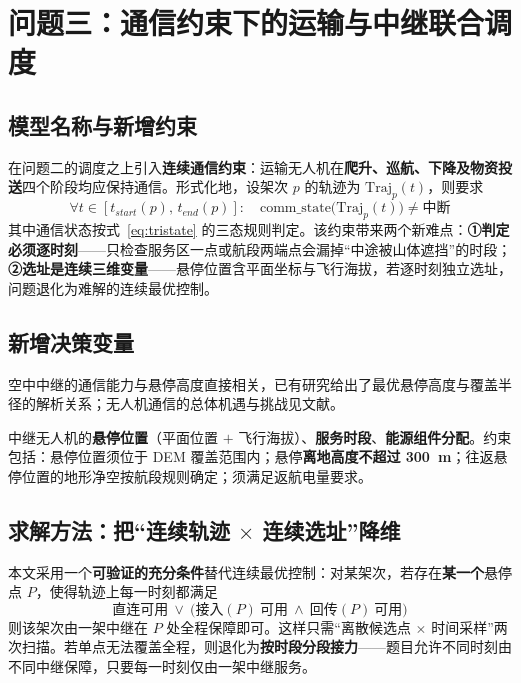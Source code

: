 \section{问题三：通信约束下的运输与中继联合调度}\label{sec:q3}

\subsection{模型名称与新增约束}

在问题二的调度之上引入\textbf{连续通信约束}：运输无人机在\textbf{爬升、巡航、下降及物资投送}四个阶段均应保持通信。形式化地，设架次 $p$ 的轨迹为 $\mathrm{Traj}_{p}(t)$，则要求
\begin{equation}
	\forall t\in[t_{start}(p),\,t_{end}(p)]:\quad
	\mathrm{comm\_state}\big(\mathrm{Traj}_{p}(t)\big)\neq\text{中断}
	\label{eq:contcomm}
\end{equation}
其中通信状态按式~\eqref{eq:tristate} 的三态规则判定。该约束带来两个新难点：\textbf{①判定必须逐时刻}——只检查服务区一点或航段两端点会漏掉“中途被山体遮挡”的时段；\textbf{②选址是连续三维变量}——悬停位置含平面坐标与飞行海拔，若逐时刻独立选址，问题退化为难解的连续最优控制。

\subsection{新增决策变量}

空中中继的通信能力与悬停高度直接相关，已有研究给出了最优悬停高度与覆盖半径的解析关系\cite{alhourani2014lap}；无人机通信的总体机遇与挑战见文献\cite{zeng2016uavcomm}。

中继无人机的\textbf{悬停位置}（平面位置 $+$ 飞行海拔）、\textbf{服务时段}、\textbf{能源组件分配}。约束包括：悬停位置须位于 DEM 覆盖范围内；悬停\textbf{离地高度不超过 \SI{300}{m}}；往返悬停位置的地形净空按航段规则确定；须满足返航电量要求。

\subsection{求解方法：把“连续轨迹 $\times$ 连续选址”降维}

本文采用一个\textbf{可验证的充分条件}替代连续最优控制：对某架次，若存在\textbf{某一个}悬停点 $P$，使得轨迹上每一时刻都满足
\begin{equation}
	\text{直连可用}\ \vee\ \big(\text{接入}(P)\ \text{可用}
	\ \wedge\ \text{回传}(P)\ \text{可用}\big)
	\label{eq:suffcond}
\end{equation}
则该架次由一架中继在 $P$ 处全程保障即可。这样只需“离散候选点 $\times$ 时间采样”两次扫描。若单点无法覆盖全程，则退化为\textbf{按时段分段接力}——题目允许不同时刻由不同中继保障，只要每一时刻仅由一架中继服务。

